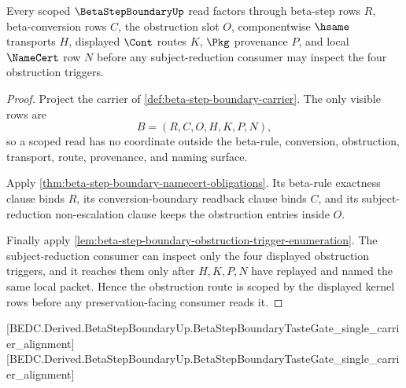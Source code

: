 \begin{theorem}
\label{thm:betastepboundary-scoped-obstruction-route}
Every scoped $\BetaStepBoundaryUp$ read factors through beta-step rows $R$, beta-conversion rows $C$, the obstruction slot $O$, componentwise $\hsame$ transports $H$, displayed $\Cont$ routes $K$, $\Pkg$ provenance $P$, and local $\NameCert$ row $N$ before any subject-reduction consumer may inspect the four obstruction triggers.
\end{theorem}
\begin{proof}
Project the carrier of \autoref{def:beta-step-boundary-carrier}. The only visible rows are
$$
B=(R,C,O,H,K,P,N),
$$
so a scoped read has no coordinate outside the beta-rule, conversion, obstruction, transport, route, provenance, and naming surface.

Apply \autoref{thm:beta-step-boundary-namecert-obligations}. Its beta-rule exactness clause binds $R$, its conversion-boundary readback clause binds $C$, and its subject-reduction non-escalation clause keeps the obstruction entries inside $O$.

Finally apply \autoref{lem:beta-step-boundary-obstruction-trigger-enumeration}. The subject-reduction consumer can inspect only the four displayed obstruction triggers, and it reaches them only after $H,K,P,N$ have replayed and named the same local packet. Hence the obstruction route is scoped by the displayed kernel rows before any preservation-facing consumer reads it.
\end{proof}

[BEDC.Derived.BetaStepBoundaryUp.BetaStepBoundaryTasteGate\_single\_carrier\_alignment]
[BEDC.Derived.BetaStepBoundaryUp.BetaStepBoundaryTasteGate\_single\_carrier\_alignment]

\begin{closurestatus}{\BetaStepBoundaryUp}
  \theoryclosure{\scopedClosure}
  \formalstatus{\unformalizedV}
\end{closurestatus}
